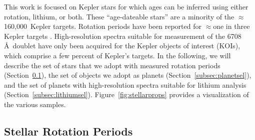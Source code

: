 \documentclass[11pt,twocolumn,tighten]{aastex63}
\newcommand{\nkeplerstars}{$\approx$160{,}000}
\begin{document}
\begin{figure*}[!t]
	\begin{center}
	\end{center}
	\vspace{-0.5cm}
	\caption{
		{\bf The stars.}  Our analysis focuses on stars observed by Kepler
		with previously reported rotation periods (dark gray points).
		The rotation periods were primarily measured by \citet{Santos_2019,Santos_2021}.
		About half of these rotators are suitable for gyrochronology
		(black points), based on factors including their temperatures,
		surface gravities, non-binarity, and proximity to the main
		sequence (see Section~\ref{subsec:flags}).   Some are
		``confirmed'' or ``candidate'' Kepler Objects of Interest that
		meet an additional set of planetary quality criteria (blue points;
		Section~\ref{subsec:plflags}).  Surface gravities and effective
		temperatures were derived photometrically by \citet{Berger_2020a_catalog}.
	}
	\label{fig:stellarprops}
\end{figure*}


This work is focused on Kepler stars for which ages can be inferred
using either rotation, lithium, or both.  These ``age-dateable
stars'' are a minority of the \nkeplerstars\ Kepler targets.  Rotation
periods have been reported for $\approx$one in three Kepler targets
\citep[e.g.][]{McQuillan_2014,Santos_2021}.  High-resolution spectra
suitable for measurement of the  6708\,\AA\ doublet
have only been acquired for the Kepler objects of interest
(KOIs), which comprise a few percent of Kepler's targets.
In the following, we will describe the set of stars that we
adopt with measured rotation periods (Section~\ref{subsec:rotsel}),
the set of objects we adopt as planets
(Section~\ref{subsec:planetsel}), and the set of planets with
high-resolution spectra suitable for lithium analysis
(Section~\ref{subsec:lithiumsel}).
Figure~\ref{fig:stellarprops} provides a visualization of the various samples.


\subsection{Stellar Rotation Periods}
\label{subsec:rotsel}
\end{document}
